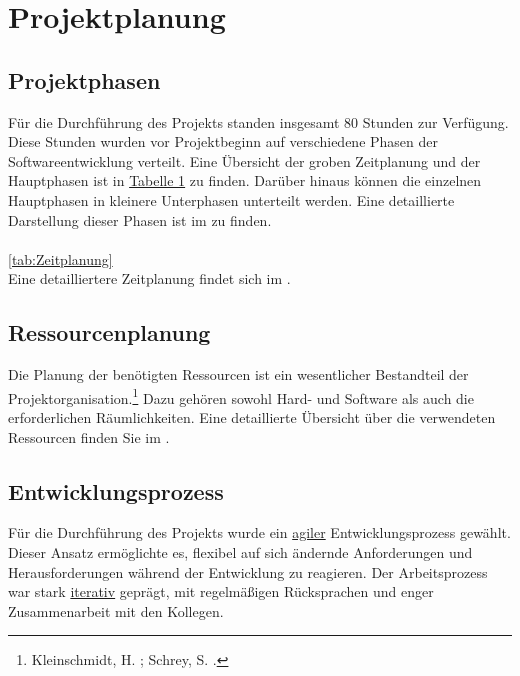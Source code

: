 
\section{Projektplanung} 
\label{sec:Projektplanung}

\subsection{Projektphasen}
\label{sec:Projektphasen}

Für die Durchführung des Projekts standen insgesamt 80 Stunden zur Verfügung. Diese Stunden wurden vor Projektbeginn auf verschiedene Phasen der Softwareentwicklung verteilt. Eine Übersicht der groben Zeitplanung und der Hauptphasen ist in
\hyperref[tab:Zeitplanung]{\textcolor{AOBlau}{Tabelle 1}} zu finden. Darüber hinaus können die einzelnen Hauptphasen in kleinere Unterphasen unterteilt werden. Eine detaillierte Darstellung dieser Phasen ist im  zu finden.

\paragraph{}
\ref{tab:Zeitplanung}
\\
Eine detailliertere Zeitplanung findet sich im .

\subsection{Ressourcenplanung}
\label{sec:Ressourcenplanung}

Die Planung der benötigten Ressourcen ist ein wesentlicher Bestandteil der Projektorganisation.\footnote{Kleinschmidt, H. \cite{Kleinschmidt2012}; Schrey, S. \cite{Schrey2011}.} Dazu gehören sowohl Hard- und Software als auch die erforderlichen Räumlichkeiten. Eine detaillierte Übersicht über die verwendeten Ressourcen finden Sie im . 

\subsection{Entwicklungsprozess}
\label{sec:Entwicklungsprozess}

Für die Durchführung des Projekts wurde ein \hyperlink{agil}{\textcolor{AOBlau}{agiler}} Entwicklungsprozess gewählt. Dieser Ansatz ermöglichte es, flexibel auf sich ändernde Anforderungen und Herausforderungen während der Entwicklung zu reagieren. Der Arbeitsprozess war stark \hyperlink{iterativ}{\textcolor{AOBlau}{iterativ}} geprägt, mit regelmäßigen Rücksprachen und enger Zusammenarbeit mit den Kollegen.

